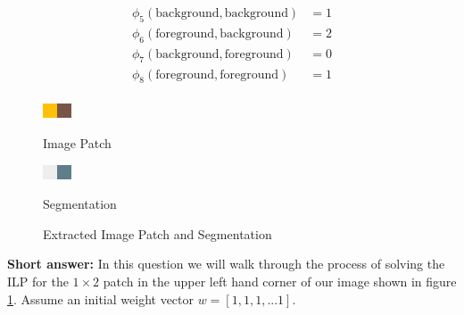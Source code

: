 \documentclass[11pt,addpoints,answers]{exam}
\numberwithin{equation}{section} %
\numberwithin{figure}{section} %
\numberwithin{table}{section} %
\begin{document}
\begin{questions}
\begin{equation*}
    \begin{split}
        \phi_5(\text{background}, \text{background}) &= 1 \\
        \phi_6(\text{foreground}, \text{background}) &= 2 \\
        \phi_7(\text{background}, \text{foreground}) &= 0 \\
        \phi_8(\text{foreground}, \text{foreground}) &= 1 \\
    \end{split}
\end{equation*}

\begin{figure}[!htb]
\centering
{}
  \includegraphics[width=\linewidth]{figures/patch.png}
  \caption*{Image Patch}\label{fig:patch}
\endminipage\hspace{1em}
  \includegraphics[width=\linewidth]{figures/patch_labels.png}
  \caption*{Segmentation}\label{fig:patch_labels}
\endminipage
\caption{Extracted Image Patch and Segmentation}
\label{fig:path_q}
\end{figure}


\question[7]\label{q}\textbf{Short answer:}  In this question we will walk through the process of solving the ILP for the $1 \times 2$ patch in the upper left hand corner of our image shown in figure \ref{fig:path_q}. Assume an initial weight vector  $w = [1,1,1,...1]$.
\begin{parts}

\end{parts}
\end{questions}
\end{document}
